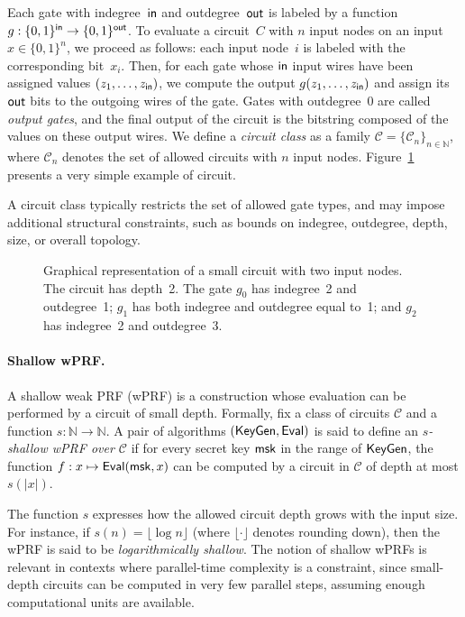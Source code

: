 Each gate with indegree~$\mathsf{in}$ and outdegree~$\mathsf{out}$ is labeled by a function $g: \{0,1\}^\mathsf{in} \to \{0,1\}^\mathsf{out}$. To evaluate a circuit~$C$ with $n$ input nodes on an input $x \in \{0,1\}^n$, we proceed as follows: each input node~$i$ is labeled with the corresponding bit~$x_i$. Then, for each gate whose $\mathsf{in}$ input wires have been assigned values $(z_1, \dots, z_\mathsf{in})$, we compute the output $g(z_1, \dots, z_\mathsf{in})$ and assign its $\mathsf{out}$ bits to the outgoing wires of the gate. Gates with outdegree~0 are called \emph{output gates}, and the final output of the circuit is the bitstring composed of the values on these output wires. We define a \emph{circuit class} as a family $\mathcal{C} = \{\mathcal{C}_n\}_{n \in \mathbb{N}}$, where $\mathcal{C}_n$ denotes the set of allowed circuits with $n$ input nodes. Figure~\ref{fig:circuit} presents a very simple example of circuit.

A circuit class typically restricts the set of allowed gate types, and may impose additional structural constraints, such as bounds on indegree, outdegree, depth, size, or overall topology.


\begin{figure}
\centering

\caption{\label{fig:circuit}Graphical representation of a small circuit with two input nodes. The circuit has depth~2. The gate $g_0$ has indegree~2 and outdegree~1; $g_1$ has both indegree and outdegree equal to~1; and $g_2$ has indegree~2 and outdegree~3.}
\end{figure}

\paragraph{Shallow wPRF.}
A shallow weak PRF (wPRF) is a construction whose evaluation can be performed by a circuit of small depth. Formally, fix a class of circuits $\mathcal{C}$ and a function $s: \mathbb{N} \to \mathbb{N}$. A pair of algorithms $(\mathsf{KeyGen}, \mathsf{Eval})$ is said to define an \emph{$s$-shallow wPRF over $\mathcal{C}$} if for every secret key $\mathsf{msk}$ in the range of $\mathsf{KeyGen}$, the function $f : x \mapsto \mathsf{Eval}(\mathsf{msk}, x)$ can be computed by a circuit in $\mathcal{C}$ of depth at most $s(|x|)$.

The function $s$ expresses how the allowed circuit depth grows with the input size. For instance, if $s(n) = \lfloor\log n\rfloor$ (where $\lfloor\cdot\rfloor$ denotes rounding down), 
then the wPRF is said to be \emph{logarithmically shallow}. The notion of shallow wPRFs is relevant in contexts where parallel-time complexity is a constraint, since small-depth circuits can be computed in very few parallel steps, assuming enough computational units are available.


